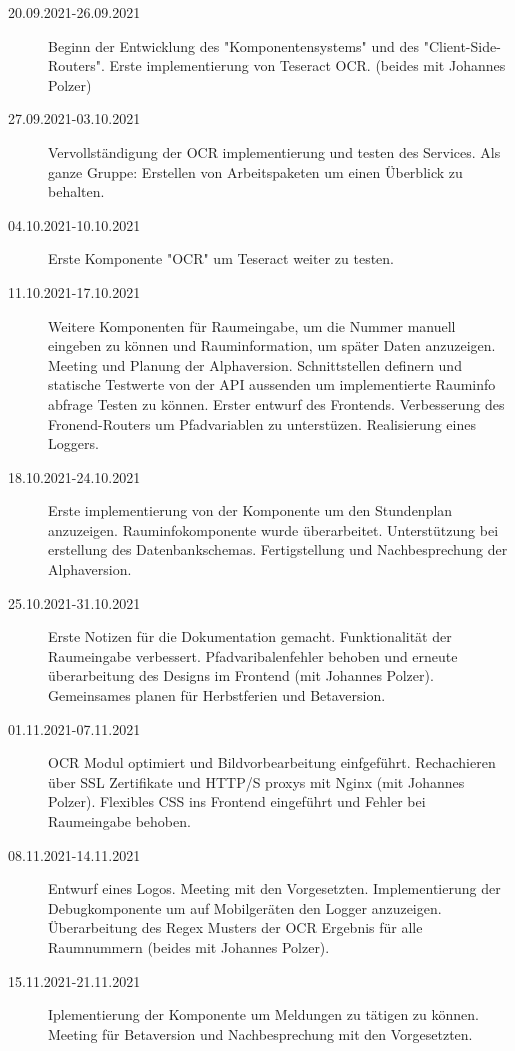 
\begin{description}
    \item[20.09.2021-26.09.2021]Beginn der Entwicklung des "Komponentensystems" und des "Client-Side-Routers". Erste implementierung von Teseract OCR. (beides mit Johannes Polzer)
    \item[27.09.2021-03.10.2021] Vervollständigung der OCR implementierung und testen des Services. Als ganze Gruppe: Erstellen von Arbeitspaketen um einen Überblick zu behalten.
    \item[04.10.2021-10.10.2021] Erste Komponente "OCR" um Teseract weiter zu testen.
    \item[11.10.2021-17.10.2021] Weitere Komponenten für Raumeingabe, um die Nummer manuell eingeben zu können und Rauminformation, um später Daten anzuzeigen. Meeting und Planung der Alphaversion. Schnittstellen definern und statische Testwerte von der API aussenden um implementierte Rauminfo abfrage Testen zu können. Erster entwurf des Frontends. Verbesserung des Fronend-Routers um Pfadvariablen zu unterstüzen. Realisierung eines Loggers.
    \item[18.10.2021-24.10.2021] Erste implementierung von der Komponente um den Stundenplan anzuzeigen. Rauminfokomponente wurde überarbeitet. Unterstützung bei erstellung des Datenbankschemas. Fertigstellung und Nachbesprechung der Alphaversion.
    \item[25.10.2021-31.10.2021] Erste Notizen für die Dokumentation gemacht. Funktionalität der Raumeingabe verbessert. Pfadvaribalenfehler behoben und erneute überarbeitung des Designs im Frontend (mit Johannes Polzer). Gemeinsames planen für Herbstferien und Betaversion.
    \item[01.11.2021-07.11.2021] OCR Modul optimiert und Bildvorbearbeitung einfgeführt. Rechachieren über SSL Zertifikate und HTTP/S proxys mit Nginx (mit Johannes Polzer). Flexibles CSS ins Frontend eingeführt und Fehler bei Raumeingabe behoben.
    \item[08.11.2021-14.11.2021] Entwurf eines Logos. Meeting mit den Vorgesetzten. Implementierung der Debugkomponente um auf Mobilgeräten den Logger anzuzeigen. Überarbeitung des Regex Musters der OCR Ergebnis für alle Raumnummern (beides mit Johannes Polzer).
    \item[15.11.2021-21.11.2021] Iplementierung der Komponente um Meldungen zu tätigen zu können. Meeting für Betaversion und Nachbesprechung mit den Vorgesetzten. 

\end{description}
